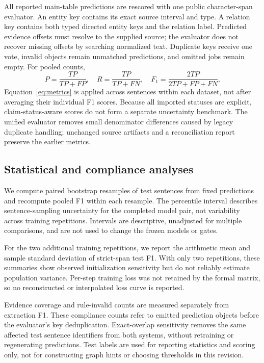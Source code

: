 \documentclass[preprint,12pt]{elsarticle}
\begin{document}
All reported main-table predictions are rescored with one public
character-span evaluator. An entity key contains its exact source interval
and type. A relation key contains both typed directed entity keys and the
relation label. Predicted evidence offsets must resolve to the supplied source;
the evaluator does not recover missing offsets by searching normalized text.
Duplicate keys receive one vote, invalid objects remain unmatched predictions,
and omitted jobs remain empty. For pooled counts,
\begin{equation}
P=\frac{TP}{TP+FP},\quad R=\frac{TP}{TP+FN},\quad
F_1=\frac{2TP}{2TP+FP+FN}.
\label{eq:metrics}
\end{equation}
Equation~\eqref{eq:metrics} is applied across sentences within each dataset,
not after averaging their individual F1 scores. Because all imported statuses
are explicit, claim-status-aware scores do not form a separate uncertainty
benchmark. The unified evaluator removes small denominator differences caused
by legacy duplicate handling; unchanged source artifacts and a reconciliation
report preserve the earlier metrics.

\subsection{Statistical and compliance analyses}
We compute paired bootstrap resamples of test sentences from fixed predictions
and recompute pooled F1 within each resample.
The percentile interval describes sentence-sampling uncertainty for the
completed model pair, not variability across training repetitions. Intervals are
descriptive, unadjusted for multiple comparisons, and are not used to change
the frozen models or gates.

For the two additional training repetitions, we report the arithmetic mean and sample
standard deviation of strict-span test F1. With only two repetitions, these
summaries show observed initialization sensitivity but do not reliably estimate
population variance. Per-step training loss was not retained by the formal
matrix, so no reconstructed or interpolated loss curve is reported.

Evidence coverage and rule-invalid counts are measured separately from
extraction F1. These compliance counts refer to emitted prediction objects
before the evaluator's key deduplication. Exact-overlap sensitivity removes
the same affected test sentence identifiers from both systems, without
retraining or regenerating predictions. Test labels are used for reporting
statistics and scoring only, not for constructing graph hints or choosing
thresholds in this revision.
\end{document}
